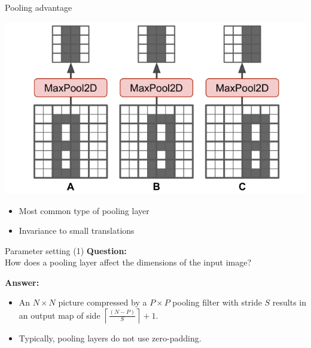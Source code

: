 \documentclass[default, aspectratio=169]{beamer}
\begin{document}
	
	
	\begin{frame}{Pooling advantage}
		
		\centering
		\includegraphics[keepaspectratio, scale=0.3]{pic/Pooling_4.png}
		\bigskip
		\begin{itemize}
			\item Most common type of pooling layer
			\item Invariance to small translations
		\end{itemize}
		
	\end{frame}
	
	\begin{frame}{Parameter setting (1)}
		\textbf{Question:} \\
		How does a pooling layer affect the dimensions of the input image?
		
		\bigskip
		
		\textbf{Answer:} \\
		\begin{itemize}
			\item An $N \times N$ picture compressed by a $P \times P$ pooling filter with stride $S$ results in an output map of side $\left\lceil \frac{(N - P)}{S} \right\rceil + 1$.
			\item Typically, pooling layers do not use zero-padding.
		\end{itemize}
	\end{frame}
	
\end{document}
